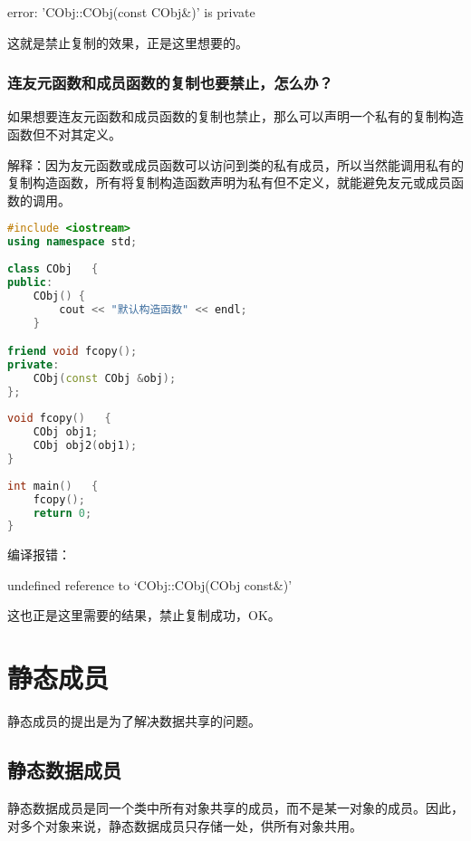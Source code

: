 \documentclass{article}
\begin{document}
error: 'CObj::CObj(const CObj\&)' is private

这就是禁止复制的效果，正是这里想要的。
\subsubsection{连友元函数和成员函数的复制也要禁止，怎么办？}
\label{sec-5-5-2}

如果想要连友元函数和成员函数的复制也禁止，那么可以声明一个私有的复制构造函数但不对其定义。

解释：因为友元函数或成员函数可以访问到类的私有成员，所以当然能调用私有的复制构造函数，所有将复制构造函数声明为私有但不定义，就能避免友元或成员函数的调用。
\begin{lstlisting}[language=c++]
#include <iostream>  
using namespace std;  
  
class CObj   {  
public:  
    CObj() {      
        cout << "默认构造函数" << endl;  
    }  

friend void fcopy();  
private:  
    CObj(const CObj &obj);  
};  
  
void fcopy()   {  
    CObj obj1;  
    CObj obj2(obj1);  
}  
  
int main()   {  
    fcopy();  
    return 0;  
}  
\end{lstlisting}

编译报错：

undefined reference to `CObj::CObj(CObj const\&)'

这也正是这里需要的结果，禁止复制成功，OK。

\section{静态成员}
\label{sec-6}
静态成员的提出是为了解决数据共享的问题。

\subsection{静态数据成员}
\label{sec-6-1}
静态数据成员是同一个类中所有对象共享的成员，而不是某一对象的成员。因此，对多个对象来说，静态数据成员只存储一处，供所有对象共用。
\end{document}
